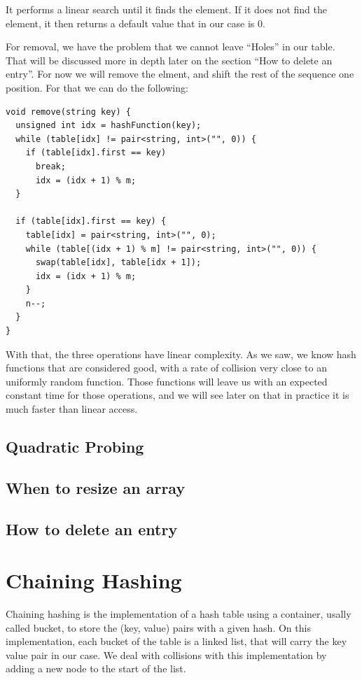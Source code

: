 It performs a linear search until it finds the element. If it does not find the element, it then returns a default value that in our case is 0. 

For removal, we have the problem that we cannot leave ``Holes'' in our table. That will be discussed more in depth later on the section ``How to delete an entry''. For now we will remove the elment, and shift the rest of the sequence one position. For that we can do the following:

\begin{lstlisting}
void remove(string key) {
  unsigned int idx = hashFunction(key);
  while (table[idx] != pair<string, int>("", 0)) {
    if (table[idx].first == key) 
      break;
      idx = (idx + 1) % m;
  }
    
  if (table[idx].first == key) {
    table[idx] = pair<string, int>("", 0);
    while (table[(idx + 1) % m] != pair<string, int>("", 0)) {
      swap(table[idx], table[idx + 1]);
      idx = (idx + 1) % m;
    }
    n--;
  }  
}
\end{lstlisting}

With that, the three operations have linear complexity. As we saw, we know hash functions that are considered good, with a rate of collision very close to an uniformly random function. Those functions will leave us with an expected constant time for those operations, and we will see later on that in practice it is much faster than linear access.

\subsection{Quadratic Probing}

\subsection{When to resize an array}

\subsection{How to delete an entry}

\section{Chaining Hashing}

Chaining hashing is the implementation of a hash table using a container, usally called bucket, to store the (key, value) pairs with a given hash. On this implementation, each bucket of the table is a linked list, that will carry the key value pair in our case. We deal with collisions with this implementation by adding a new node to the start of the list.


